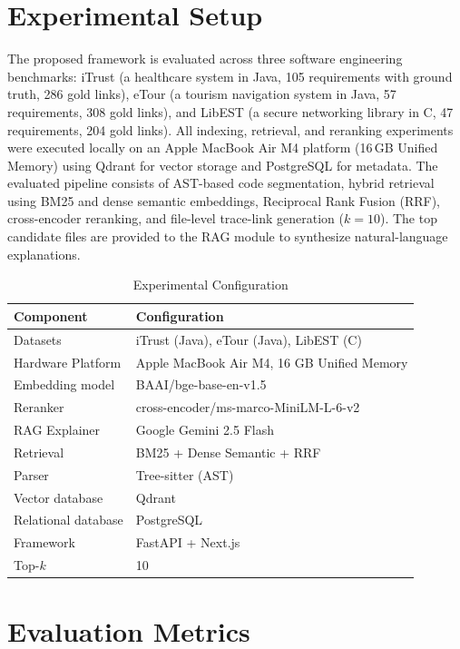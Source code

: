 \documentclass[conference]{IEEEtran}
\renewcommand{\arraystretch}{1.15}
\begin{document}
\section{Experimental Setup}

The proposed framework is evaluated across three software engineering benchmarks: iTrust (a healthcare system in Java, 105 requirements with ground truth, 286 gold links), eTour (a tourism navigation system in Java, 57 requirements, 308 gold links), and LibEST (a secure networking library in C, 47 requirements, 204 gold links). All indexing, retrieval, and reranking experiments were executed locally on an Apple MacBook Air M4 platform (16\,GB Unified Memory) using Qdrant for vector storage and PostgreSQL for metadata. The evaluated pipeline consists of AST-based code segmentation, hybrid retrieval using BM25 and dense semantic embeddings, Reciprocal Rank Fusion (RRF), cross-encoder reranking, and file-level trace-link generation ($k=10$). The top candidate files are provided to the RAG module to synthesize natural-language explanations.

\begin{table}[H]
\centering
\caption{Experimental Configuration}
\label{tab:config}
\small
\renewcommand{\arraystretch}{1.08}
\begin{tabular}{@{}p{3.0cm}p{4.5cm}@{}}
\toprule
\textbf{Component} & \textbf{Configuration} \\
\midrule
Datasets & iTrust (Java), eTour (Java), LibEST (C) \\
Hardware Platform & Apple MacBook Air M4, 16 GB Unified Memory \\
Embedding model & BAAI/bge-base-en-v1.5 \\
Reranker & cross-encoder/ms-marco-MiniLM-L-6-v2 \\
RAG Explainer & Google Gemini 2.5 Flash \\
Retrieval & BM25 + Dense Semantic + RRF \\
Parser & Tree-sitter (AST) \\
Vector database & Qdrant \\
Relational database & PostgreSQL \\
Framework & FastAPI + Next.js \\
Top-$k$ & 10 \\
\bottomrule
\end{tabular}
\end{table}

\section{Evaluation Metrics}
\end{document}
